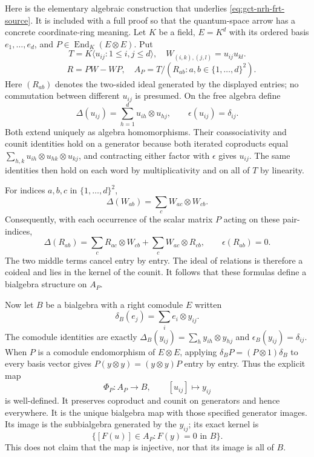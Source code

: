 Here is the elementary algebraic construction that underlies
\eqref{eq:gct-nrh-frt-source}.  It is included with a full proof so that
the quantum-space arrow has a concrete coordinate-ring meaning.
Let $K$ be a field, $E=K^d$ with its ordered basis $e_1,\ldots,e_d$, and
$P\in\operatorname{End}_K(E\otimes E)$.  Put
\[
 T=K\langle u_{ij}:1\le i,j\le d\rangle,
 \quad W_{(i,k),(j,l)}=u_{ij}u_{kl}.
\]
\[
 \quad R=PW-WP,
 \quad A_P=T/(R_{ab}:a,b\in\{1,\ldots,d\}^2).
\]
Here $(R_{ab})$ denotes the two-sided ideal generated by the displayed
entries; no commutation between different $u_{ij}$ is presumed.
On the free algebra define
\[
 \Delta(u_{ij})=\sum_{h=1}^{d}u_{ih}\otimes u_{hj},
 \qquad \epsilon(u_{ij})=\delta_{ij}.
\]
Both extend uniquely as algebra homomorphisms.  Their coassociativity
and counit identities hold on a generator because both iterated
coproducts equal
$\sum_{h,k}u_{ih}\otimes u_{hk}\otimes u_{kj}$, and contracting either
factor with $\epsilon$ gives $u_{ij}$.  The same identities then hold on
each word by multiplicativity and on all of $T$ by linearity.

For indices $a,b,c$ in $\{1,\ldots,d\}^2$,
\[
 \Delta(W_{ab})=\sum_c W_{ac}\otimes W_{cb}.
\]
Consequently, with each occurrence of the scalar matrix $P$ acting on
these pair-indices,
\[
 \Delta(R_{ab})
 =\sum_c R_{ac}\otimes W_{cb}
       +\sum_c W_{ac}\otimes R_{cb},
 \qquad \epsilon(R_{ab})=0.
\]
The two middle terms cancel entry by entry.  The ideal of relations is
therefore a coideal and lies in the kernel of the counit.  It follows
that these formulas define a bialgebra structure on $A_P$.

Now let $B$ be a bialgebra with a right comodule $E$ written
\[
 \delta_B(e_j)=\sum_i e_i\otimes y_{ij}.
\]
The comodule identities are exactly
$\Delta_B(y_{ij})=\sum_h y_{ih}\otimes y_{hj}$ and
$\epsilon_B(y_{ij})=\delta_{ij}$.  When $P$ is a comodule endomorphism
of $E\otimes E$, applying $\delta_B P=(P\otimes1)\delta_B$ to every
basis vector gives
$P(y\otimes y)=(y\otimes y)P$ entry by entry.  Thus the explicit map
\begin{equation}\label{eq:gct-nrh-universal-map}
 \Phi_P:A_P\longrightarrow B,\qquad
       [u_{ij}]\longmapsto y_{ij}
\end{equation}
is well-defined.  It preserves coproduct and counit on generators and
hence everywhere.  It is the unique bialgebra map with those specified
generator images.  Its image is the subbialgebra generated by the
$y_{ij}$; its exact kernel is
\[
 \{[F(u)]\in A_P:F(y)=0\text{ in }B\}.
\]
This does not claim that the map is injective, nor that its image is all
of $B$.


